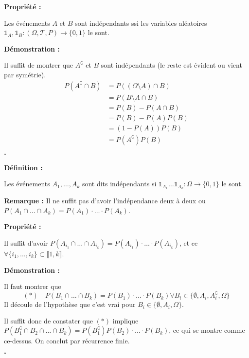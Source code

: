 \documentclass[10pt,a4paper,notitlepage ]{report}
\newcommand{\1}{\mathds 1}
\newcommand{\comp}[1]{#1^\complement}
\newenvironment{definition}[1][]{
	
	\textbf{Définition #1 : }
}
{}
\newcounter{th}
\newenvironment{propriete}[1][]{
	\begin{tcolorbox}
		\textbf{Propriété #1 : }
}
{\end{tcolorbox}}
\newenvironment{demo}[1][]{

	\textbf{Démonstration #1 :}
}{\begin{flushright}
	$\square$
\end{flushright}
}
\newenvironment{rem}{
	
		\textbf{Remarque :}}{}
\begin{document}
\begin{propriete}
	Les événements $A$ et $B$ sont indépendants ssi les variables aléatoires $\mathds{1}_A, \mathds{1}_B : (\Omega, \mathcal T, P) \rightarrow \{0,1\}$ le sont.
\end{propriete}

\begin{demo}
	Il suffit de montrer que $\comp A$ et $B$ sont indépendants (le reste est évident ou vient par symétrie).
	\begin{align*}
		P(\comp A\cap B) &= P((\Omega \setminus A) \cap B) \\
		&= P(B \setminus A\cap B) \\
		&= P(B) - P(A\cap B) \\
		&= P(B) - P(A)P(B) \\
		&= (1-P(A))P(B) \\
		&= P(\comp A)P(B)
	\end{align*} 
\end{demo}

\begin{definition}
	Les événements $A_1,\dots,A_k$ sont dits indépendants si $\mathds 1_{A_1} \dots \mathds 1_{A_k} : \Omega \rightarrow \{0,1\}$ le sont.
\end{definition}

\begin{rem}
	Il ne suffit pas d'avoir l'indépendance deux à deux ou $P(A_1 \cap \dots \cap A_k) = P(A_1) \cdot \dots \cdot P(A_k)$.
\end{rem}

\begin{propriete}
	Il suffit d'avoir $P(A_{i_1} \cap \dots \cap A_{i_k}) = P(A_{i_1}) \cdot \dots \cdot P(A_{i_k})$, et ce $\forall \{i_1, \dots, i_k\} \subset \llbracket 1,k \rrbracket$.
\end{propriete}

\begin{demo}
	Il faut montrer que
	\[ (*) \quad P(B_1 \cap \dots \cap B_k) = P(B_1) \cdot \dots \cdot P(B_k) \forall B_i \in \{\emptyset, A_i, \comp{A_i}, \Omega\}	\]
	Il découle de l'hypothèse que c'est vrai pour $B_i \in \{ \emptyset, A_i, \Omega\}$.
	
	Il suffit donc de constater que $(*)$ implique $P (\comp{B_1} \cap B_2 \cap \dots \cap B_k) = P(\comp{B_1})P(B_2) \cdot \dots \cdot P(B_k)$, ce qui se montre comme ce-dessus. On conclut par récurrence finie.
\end{demo}
\end{document}
